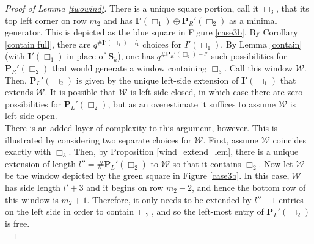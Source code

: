 \documentclass{article}
\theoremstyle{definition}
\numberwithin{equation}{subsection}
\begin{document}
\begin{proof}[Proof of Lemma \ref{twowind}]
\noindent There is a unique square portion, call it $\Box_3$, that its top left corner on row $m_2$ and has $\mathbf{I}'(\Box_1)\oplus \mathbf{P}_R'(\Box_2)$ as a minimal generator. This is depicted as the blue square in Figure \ref{case3b}. By Corollary \ref{contain full}, there are $q^{\#\textbf{I}'(\Box_1) -l_1}$ choices for $I'(\Box_1)$. By Lemma \ref{contain} (with $\mathbf{I}'(\Box_1)$ in place of $\mathbf{S}_k$), one has $q^{\#\mathbf{P}_R'(\Box_2)-l'}$ such possibilities for $\mathbf{P}_R'(\Box_2)$ that would generate a window containing $\Box_3$. Call this window $\mathcal{W}$. Then, $\mathbf{P}_L'(\Box_2)$ is given by the unique left-side extension of $\mathbf{I}'(\Box_1)$ that extends $\mathcal{W}$. It is possible that $\mathcal{W}$ is left-side closed, in which case there are zero possibilities for $\mathbf{P}_L'(\Box_2)$, but as an overestimate it suffices to assume $\mathcal{W}$ is left-side open.\\

\noindent There is an added layer of complexity to this argument, however. This is illustrated by considering two separate choices for $\mathcal{W}$. First, assume $\mathcal{W}$ coincides exactly with $\Box_3$. Then, by Proposition \ref{wind_extend_lem}, there is a unique extension of length $l''=\#\mathbf{P}_L'(\Box_2)$ to $\mathcal{W}$ so that it contains $\Box_2$. Now let $\mathcal{W}$ be the window depicted by the green square in Figure \ref{case3b}. In this case, $\mathcal{W}$ has side length $l'+3$ and it begins on row $m_2-2$, and hence the bottom row of this window is $m_2+1$. Therefore, it only needs to be extended by $l''-1$ entries on the left side in order to contain $\Box_2$, and so the left-most entry of $\mathbf{P}_L'(\Box_2)$ is free. \\


\end{proof}
\end{document}
